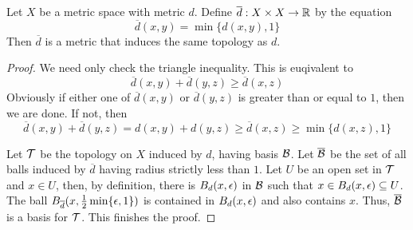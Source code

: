 \begin{theorem}
    Let $X$ be a metric space with metric $d$. Define $\overline{d}:X\times X\to\mathbb{R}$ by the equation 
    \begin{equation*}
        \overline{d}(x,y) = \min\{d(x,y), 1\}
    \end{equation*}
    Then $\overline{d}$ is a metric that induces the same topology as $d$.
\end{theorem}
\begin{proof}
    We need only check the triangle inequality. This is euqivalent to 
    \begin{equation*}
        \overline{d}(x,y) + \overline{d}(y,z)\ge \overline{d}(x,z)
    \end{equation*}
    Obviously if either one of $\overline{d}(x,y)$ or $\overline{d}(y,z)$ is greater than or equal to $1$, then we are done. If not, then 
    \begin{equation*}
        \overline{d}(x,y) + \overline{d}(y,z) = d(x,y) + d(y,z)\ge\overline{d}(x,z)\ge\min\{d(x,z), 1\}
    \end{equation*}

    Let $\mathcal{T}$ be the topology on $X$ induced by $d$, having basis $\mathcal{B}$. Let $\overline{\mathcal{B}}$ be the set of all balls induced by $\overline{d}$ having radius strictly less than $1$. Let $U$ be an open set in $\mathcal{T}$ and $x\in U$, then, by definition, there is $B_d(x,\epsilon)$ in $\mathcal{B}$ such that $x\in B_d(x,\epsilon)\subseteq U$. The ball $B_{\overline{d}}(x,\frac{1}{2}\min\{\epsilon, 1\})$ is contained in $B_d(x,\epsilon)$ and also contains $x$. Thus, $\overline{\mathcal{B}}$ is a basis for $\mathcal{T}$. This finishes the proof.
\end{proof}